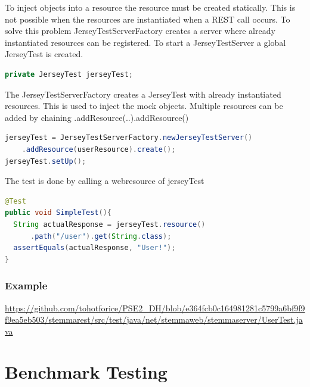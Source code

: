 \documentclass[11pt,fleqn,openany]{book} %
\begin{document}
To inject objects into a resource the resource must be created statically. This is not possible when the resources are instantiated when a REST call occurs. To solve this problem JerseyTestServerFactory creates a server where already instantiated resources can be registered. 
To start a JerseyTestServer a global JerseyTest is created.
\begin{lstlisting}[language=java]
private JerseyTest jerseyTest;
\end{lstlisting}
The JerseyTestServerFactory creates a JerseyTest with already instantiated resources. This is used to inject the mock objects. Multiple resources can be added by chaining .addResource(..).addResource()
\begin{lstlisting}[language=java]
jerseyTest = JerseyTestServerFactory.newJerseyTestServer()
	.addResource(userResource).create();
jerseyTest.setUp();
\end{lstlisting}

The test is done by calling a webresource of jerseyTest
\begin{lstlisting}[language=java]
@Test
public void SimpleTest(){
  String actualResponse = jerseyTest.resource()
      .path("/user").get(String.class);
  assertEquals(actualResponse, "User!");
}
\end{lstlisting}

\subsection*{Example}
\url{https://github.com/tohotforice/PSE2_DH/blob/e364fcb0c164981281c5799a6bf9f9f9ea5eb503/stemmarest/src/test/java/net/stemmaweb/stemmaserver/UserTest.java}



\chapter{Benchmark Testing}
\end{document}

